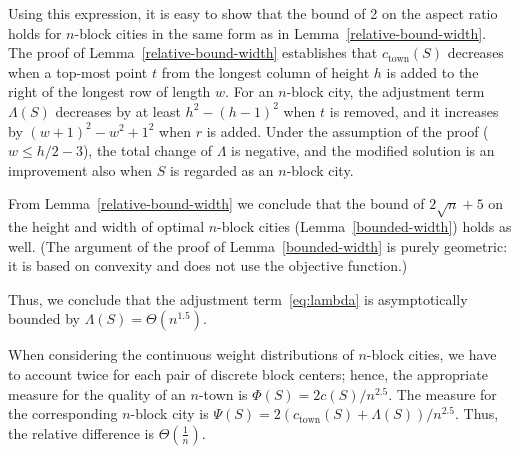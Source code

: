 \documentclass[preprint,authoryear,12pt]{elsarticle}
\begin{document}
Using this expression, it is easy to show that the bound of 2 on the
 aspect ratio holds for $n$-block cities in the same form as in
 Lemma~\ref{relative-bound-width}.
The proof of Lemma~\ref{relative-bound-width} establishes that
$c_{\textrm{town}}(S)$ decreases when a top-most point $t$ from the
longest column of height $h$ is added to the right of the
 longest row of length $w$.
For an $n$-block city, the
adjustment term
$\Lambda(S)$ decreases by at least $h^2-(h-1)^2$ when $t$ is removed,
and it increases by $(w+1)^2-w^2 + 1^2$ when $r$ is added.
Under the assumption of the proof ($w\le h/2-3$), the total change
of $\Lambda$
is negative, and the modified solution is an improvement also when
$S$ is regarded as an $n$-block city.

From Lemma~\ref{relative-bound-width} we conclude that the bound of
$2\sqrt n+5$ on the height and width of optimal $n$-block cities
(Lemma~\ref{bounded-width}) holds as well.  (The argument of the proof
of Lemma~\ref{bounded-width} is purely geometric: it is based on
convexity and does not use the objective function.)


Thus, we conclude that the adjustment term~\eqref{eq:lambda} is
asymptotically bounded by $\Lambda(S) = \Theta(n^{1.5})$.

When considering the continuous weight distributions of $n$-block
cities, we have to account twice for each pair of discrete block
centers; hence, the appropriate measure for the quality of an
$n$-town is $\Phi(S)={2c(S)}/{n^{2.5}}$. The measure for the
corresponding $n$-block city is
$\Psi(S)={2(c_{\mathrm{town}}(S)+\Lambda(S))}/{n^{2.5}}$. Thus, the relative
difference is $\Theta(\frac{1}{n})$.
\end{document}
